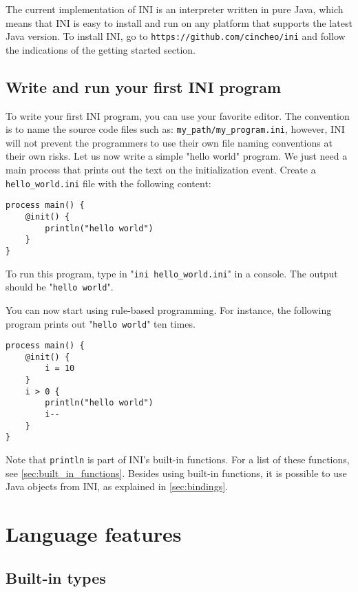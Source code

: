\documentclass[11pt]{report}
\begin{document}
The current implementation of INI is an interpreter written in pure Java, which means that INI is easy to install and run on any platform that supports the latest Java version. To install INI, go to \texttt{https://github.com/cincheo/ini} and follow the indications of the getting started section.

\section{Write and run your first INI program}

To write your first INI program, you can use your favorite editor. The convention is to name the source code files such as: \texttt{my\_path/my\_program.ini}, however, INI will not prevent the programmers to use their own file naming conventions at their own risks. Let us now write a simple "hello world" program. We just need a main process that prints out the text on the initialization event. Create a \texttt{hello\_world.ini} file with the following content:

\begin{lstlisting}
process main() {
	@init() {
		println("hello world")
	}
}
\end{lstlisting}

To run this program, type in "\texttt{ini hello\_world.ini}" in a console. The output should be "\texttt{hello world}".

You can now start using rule-based programming. For instance, the following program prints out "\texttt{hello world}" ten times.

\begin{lstlisting}
process main() {
	@init() {
		i = 10
	}
	i > 0 {
		println("hello world")
		i--
	}
}
\end{lstlisting}

Note that \texttt{println} is part of INI's built-in functions. For a list of these functions, see \ref{sec:built_in_functions}. Besides using built-in functions, it is possible to use Java objects from INI, as explained in \ref{sec:bindings}.

\chapter{Language features}

\section{Built-in types}
\end{document}
